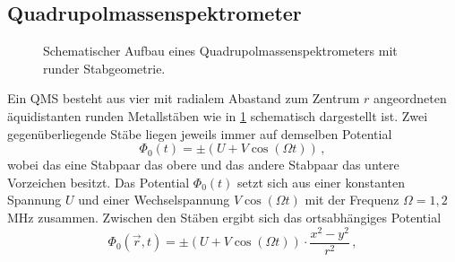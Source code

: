 \subsection{Quadrupolmassenspektrometer}\label{subsec:quadrupolmassenspektrometer}
\begin{figure}[h]
 	\centering
	\caption[Quadrupolmassenspektrometer,
	schematisch]{Schematischer Aufbau eines
	Quadrupolmassenspektrometers mit runder
	Stabgeometrie.}\label{fig:quadrupolmassenspektrometer}
\end{figure}
Ein QMS besteht aus vier mit radialem Abastand zum Zentrum $r$ angeordneten
äquidistanten runden Metallstäben wie in \ref{fig:quadrupolmassenspektrometer}
schematisch dargestellt ist. Zwei gegenüberliegende Stäbe liegen jeweils immer
auf demselben Potential
\begin{equation}\label{eq:qms_potential_0}
	\Phi_0(t)=\pm\left(U+V\cos{(\Omega t)}\right)\,,
\end{equation}
wobei das eine Stabpaar das obere und das andere Stabpaar das untere Vorzeichen
besitzt. Das Potential $\Phi_0(t)$ setzt sich aus einer konstanten Spannung $U$
und einer Wechselspannung $V\cos{(\Omega t)}$ mit der Frequenz $\Omega=1,2\,$MHz
zusammen. Zwischen den Stäben ergibt sich das ortsabhängiges Potential
\begin{equation}\label{eq:qms_potential_ort}
	\Phi_0(\vec{r},t)=\pm\left(U+V\cos{(\Omega
	t)}\right)\cdot\frac{x^2-y^2}{r^2}\,,
\end{equation}
